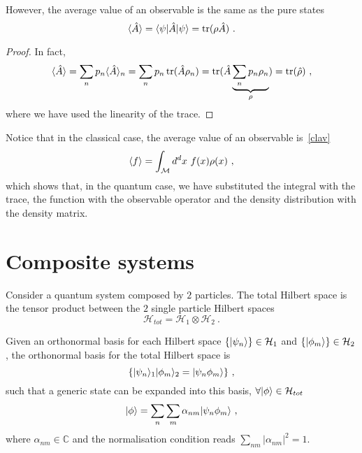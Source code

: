     However, the average value of an observable is the same as the pure states 
    \begin{equation}\label{avobs}
        \langle\hat A\rangle = \langle\psi\vert \hat A \vert\psi\rangle = \operatorname{tr} (\rho \hat A) ~.
    \end{equation}
    \begin{proof}
        In fact, 
        \begin{equation*}
            \langle\hat A\rangle = \sum_n p_n \langle\hat A\rangle_n = \sum_n p_n \operatorname{tr}(\hat A \rho_n) = \operatorname{tr} (\hat A \underbrace{\sum_n p_n \rho_n}_\rho) = \operatorname{tr} (\hat \rho) ~,
        \end{equation*}
        where we have used the linearity of the trace.
    \end{proof}

    Notice that in the classical case, the average value of an observable is~\eqref{clav}
    \begin{equation*}
        \langle f\rangle = \int_{\mathcal M} d^d x ~ f(x) \rho(x) ~,
    \end{equation*}
    which shows that, in the quantum case, we have substituted the integral with the trace, the function with the observable operator and the density distribution with the density matrix.

\section{Composite systems}

    Consider a quantum system composed by $2$ particles. The total Hilbert space is the tensor product between the $2$ single particle Hilbert spaces 
    \begin{equation*}
        \mathcal H_{tot} = \mathcal H_1 \otimes \mathcal H_2 ~. 
    \end{equation*}

    Given an orthonormal basis for each Hilbert space $\{\vert\psi_n\rangle\} \in \mathcal H_1$ and $\{\vert\phi_m\rangle\} \in \mathcal H_2$, the orthonormal basis for the total Hilbert space is 
    \begin{equation*}
        \{\vert\psi_n\rangle_1 \vert\phi_m\rangle_2 = \vert\psi_n \phi_m\rangle\} ~,
    \end{equation*}
    such that a generic state can be expanded into this basis, $\forall \vert\phi\rangle \in \mathcal H_{tot}$
    \begin{equation*}
        \vert\phi\rangle = \sum_n \sum_m \alpha_{nm} \vert\psi_n \phi_m\rangle ~,
    \end{equation*}
    where $\alpha_{nm} \in \mathbb C$ and the normalisation condition reads $\sum_{nm} |\alpha_{nm}|^2 = 1$. 

